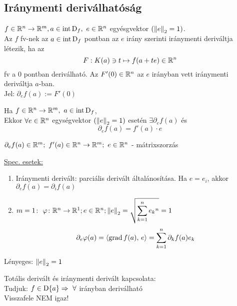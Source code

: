 \subsection{Iránymenti deriválhatóság}

\begin{de}
  $f\in\mathbb{R}^n\to\mathbb{R}^m,\\a\in\operatorname{int\,D}_f,\ e\in\mathbb{R}^n $ egyésgvektor $(\left\Vert e\right\Vert_2 = 1)$.\\
  Az $f$ fv-nek az $a\in\operatorname{int\,D}_f$ pontban az $e$  irány szerinti iránymenti deriváltja létezik, ha az
  \[F: K(a)\owns t \mapsto f(a+te) \in \mathbb{R}^n\]
  fv a $0$ pontban deriválható. Az $F'(0)\in\mathbb{R}^n$ az $e$ irányban vett iránymenti deriváltja $a$-ban.\\
  Jel: $\partial_ef(a) := F'(0)$
\end{de}

\begin{te}
  Ha $f\in\mathbb{R}^n\to\mathbb{R}^m,\ a\in\operatorname{int\,D}_f$,\\
  Ekkor $\forall e\in\mathbb{R}^n$ egységvektor $(\left\Vert e\right\Vert_2 = 1)$ esetén $\exists\partial_ef(a)$ és
\[\partial_ef(a) = f'(a)\cdot e\]
\end{te}
\begin{megj} $\partial_ef(a)\in\R^m;\ f'(a) \in\RnRm;\ e\in\R^n$ - mátrixszorzás
\end{megj}
\underline{Spec. esetek:}
\begin{enumerate}
  \item Iránymenti derivált: parciális derivált általánosítása. Ha $e=e_i$, akkor $\partial_ef(a) = \partial_if(a)$
  \item $m=1\colon \ \varphi\colon\mathbb{R}^n\to\mathbb{R}^1; e\in\mathbb{R}^n; \left\Vert e\right\Vert_2=\displaystyle\sqrt{\sum_{k=1}^n{e_k}^n} = 1$
    \[\displaystyle \partial_e\varphi(a) = \langle\operatorname{grad} f(a),\,e\rangle = \sum_{k=1}^n \partial_kf(a)e_k\]
\end{enumerate}
\begin{Megj}
\item Lényeges: $\left\Vert e\right\Vert_2=1$
\item Totális derivált és iránymenti derivált kapcsolata:\\
  Tudjuk: $f\in\operatorname{D}\{a\}\Rightarrow\ \forall$ irányban deriválható\\
  Visszafele NEM igaz!
\end{Megj}

